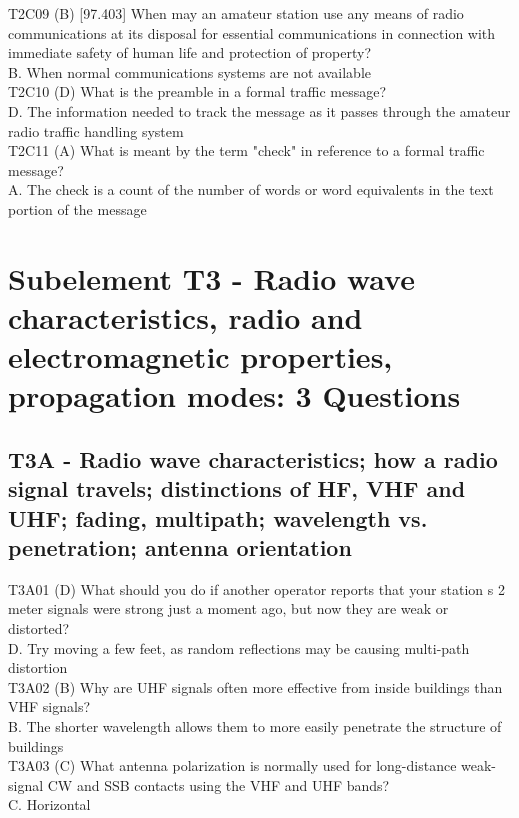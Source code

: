 \documentclass[12pt,letterpaper]{report}
\begin{document}
T2C09 (B) [97.403] When may an amateur station use any means of radio communications at its disposal for essential communications in connection with immediate safety of human life and protection of property?\\
B. When normal communications systems are not available\\

T2C10 (D) What is the preamble in a formal traffic message?\\
D. The information needed to track the message as it passes through the amateur radio traffic handling system\\

T2C11 (A) What is meant by the term "check" in reference to a formal traffic message?\\
A. The check is a count of the number of words or word equivalents in the text portion of the message\\

\chapter{Subelement T3 - Radio wave characteristics, radio and electromagnetic properties, propagation modes: 3 Questions}

\section{T3A - Radio wave characteristics; how a radio signal travels; distinctions of HF, VHF and UHF; fading, multipath; wavelength vs. penetration; antenna orientation}

T3A01 (D) What should you do if another operator reports that your station s 2 meter signals were strong just a moment ago, but now they are weak or distorted?\\
D. Try moving a few feet, as random reflections may be causing multi-path distortion\\

T3A02 (B) Why are UHF signals often more effective from inside buildings than VHF signals?\\
B. The shorter wavelength allows them to more easily penetrate the structure of buildings\\

T3A03 (C) What antenna polarization is normally used for long-distance weak-signal CW and SSB contacts using the VHF and UHF bands?\\
C. Horizontal\\
\end{document}
